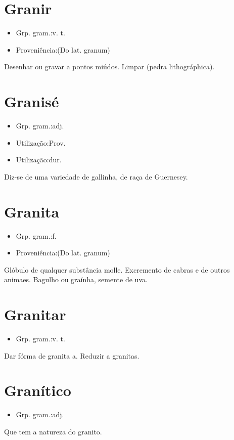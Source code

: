 \section{Granir}
\begin{itemize}
\item {Grp. gram.:v. t.}
\end{itemize}
\begin{itemize}
\item {Proveniência:(Do lat. \textunderscore granum\textunderscore )}
\end{itemize}
Desenhar ou gravar a pontos miúdos.
Limpar (pedra lithográphica).
\section{Granisé}
\begin{itemize}
\item {Grp. gram.:adj.}
\end{itemize}
\begin{itemize}
\item {Utilização:Prov.}
\end{itemize}
\begin{itemize}
\item {Utilização:dur.}
\end{itemize}
Diz-se de uma variedade de gallinha, de raça de Guernesey.
\section{Granita}
\begin{itemize}
\item {Grp. gram.:f.}
\end{itemize}
\begin{itemize}
\item {Proveniência:(Do lat. \textunderscore granum\textunderscore )}
\end{itemize}
Glóbulo de qualquer substância molle.
Excremento de cabras e de outros animaes.
Bagulho ou graínha, semente de uva.
\section{Granitar}
\begin{itemize}
\item {Grp. gram.:v. t.}
\end{itemize}
Dar fórma de granita a.
Reduzir a granitas.
\section{Granítico}
\begin{itemize}
\item {Grp. gram.:adj.}
\end{itemize}
Que tem a natureza do granito.
